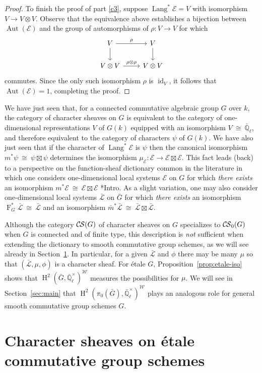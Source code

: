 \documentclass[10pt]{amsart}
\theoremstyle{plain}
\theoremstyle{definition}
\newcommand{\EE}{\mathbb{\bar Q}_\ell}
\newcommand{\Fq}{k}
\newcommand{\EEx}{\EE^\times}
\newcommand{\Weil}[1]{\mathcal{W}_{#1}}
\newcommand{\Frob}[1]{\operatorname{F}_{#1}}
\DeclareMathOperator{\Aut}{Aut}
\DeclareMathOperator{\id}{id}
\DeclareMathOperator{\Hh}{H}
\DeclareMathOperator{\Lang}{Lang}
\newcommand{\iso}{{\ \cong\ }}
\newcommand{\cs}[1]{{\mathcal{#1}}}
\newcommand{\gcs}[1]{{\mathcal{\bar #1}}}
\newcommand{\CS}{{\mathcal{C\hskip-0.8pt S}}}
\newcommand{\bCS}{{\CS_0}}
\newcommand{\bm}{\bar{m}}
\newcommand{\bG}{\bar{G}}
\begin{document}
\begin{proof}
To finish the proof of part \ref{c3}, suppose $\Lang^*\cs{E} = V$ with isomorphism $V \to V\otimes V$.  Observe that the equivalence above establishes a bijection between $\Aut(\cs{E})$ and the group of automorphisms of $\rho : V\to V$ for which 
\[
\begin{tikzcd}
\arrow{d}{} V \arrow{r}{\rho} & V\arrow{d}{}\\
V\otimes V \arrow{r}{\rho\otimes \rho} & V\otimes V
\end{tikzcd}
\]
commutes. 
Since the only such isomorphism $\rho$ is $\id_V$, it follows that $\Aut(\cs{E}) = 1$, completing the proof.
\end{proof}

We have just seen that, for a connected commutative algebraic group $G$ over $\Fq$, the category of character sheaves on $G$ is equivalent to the category of one-dimensional representations $V$ of $G(\Fq)$ equipped with an isomorphism $V\iso \EE$, and therefore equivalent to the category of characters $\psi$ of $G(\Fq)$.
We have also just seen that if the character of $\Lang^*\cs{E}$ is $\psi$ then the canonical isomorphism $m^*\psi \iso \psi \boxtimes \psi$ determines the isomorphism $\mu_\cs{E} : \cs{E} \to \cs{E}\boxtimes\cs{E}$.
This fact leads (back) to a perspective on the function-sheaf dictionary common in the literature in which one considers one-dimensional local systems $\cs{E}$ on $G$ for which \emph{there exists} an isomorphism $m^*\cs{E} \iso \cs{E} \boxtimes\cs{E}$ \cite{kamgarpour:09a}*{Intro}.
As a slight variation, one may also consider one-dimensional local systems $\gcs{L}$ on $\bG$ for which \emph{there exists} an isomorphism $\Frob{G}^*\gcs{L} \iso \gcs{L}$ and an isomorphism $\bm^*\gcs{L} \iso \gcs{L} \boxtimes\gcs{L}$.

Although the category $\CS(G)$ of character sheaves on $G$ specializes to $\bCS(G)$ when $G$ is connected and of finite type, this description is \emph{not} sufficient when extending the dictionary to smooth commutative group schemes, as we will see already in Section~\ref{sec:etale}.
In particular, for a given $\gcs{L}$ and $\phi$ there may be many $\mu$ so that $(\gcs{L},\mu,\phi)$ is a character sheaf.  For \'etale $G$, Proposition~\ref{prop:etale-iso} shows that $\Hh^2(\bG,\EEx)^{\Weil{}}$ measures the possibilities for $\mu$.  We will see in Section~\ref{sec:main} that $\Hh^2(\pi_0(\bG),\EEx)^{\Weil{}}$ plays an analogous role for general smooth commutative group schemes $G$.

\section{Character sheaves on \'etale commutative group schemes} \label{sec:etale}
\end{document}
